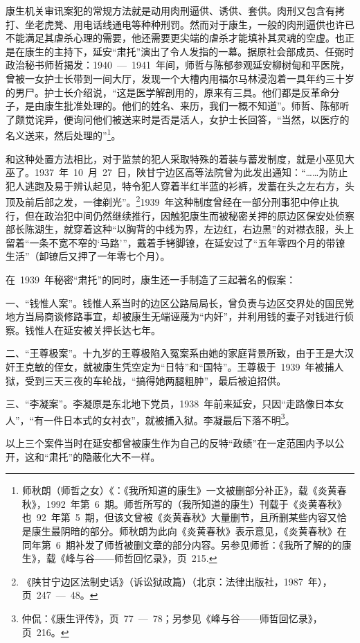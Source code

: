 康生机关审讯案犯的常规方法就是动用肉刑逼供、诱供、套供。肉刑又包含有拷打、坐老虎凳、用电话线通电等种种刑罚。然而对于康生，一般的肉刑逼供也许已不能满足其虐杀心理的需要，他还需要更尖端的虐杀才能填补其灵魂的空虚。也正是在康生的主持下，延安“肃托”演出了令人发指的一幕。据原社会部成员、任弼时政治秘书师哲揭发：1940~—~1941~年间，师哲与陈郁参观延安柳树甸和平医院，曾被一女护士长带到一间大厅，发现一个大槽内用福尔马林浸泡着一具年约三十岁的男尸。护士长介绍说，“这是医学解剖用的，原来有三具。他们都是反革命分子，是由康生批准处理的。他们的姓名、来历，我们一概不知道”。师哲、陈郁听了颇觉诧异，便询问他们被送来时是否是活人，女护士长回答，“当然，以医疗的名义送来，然后处理的”\footnote{师秋朗（师哲之女）《：《我所知道的康生》一文被删部分补正》，载《炎黄春秋》，1992~年第~6~期。师哲所写的（我所知道的康生）刊载于《炎黄春秋》也~92~年第~5~期，但该文曾被《炎黄春秋》大量删节，且所删某些内容又恰是康生最阴暗的部分。师秋朗为此向《炎黄春秋》表示意见，《炎黄春秋》在同年第~6~期补发了师哲被删文章的部分内容。另参见师哲：《我所了解的的康生》，载《峰与谷——师哲回忆录》，页~215.}。

和这种处置方法相比，对于监禁的犯人采取特殊的着装与蓄发制度，就是小巫见大巫了。1937~年~10~月~27~日，陕甘宁边区高等法院曾为此发出通知：“……为防止犯人逃跑及易于辨认起见，特令犯人穿着半红半蓝的衫裤，发蓄在头之左右方，头顶及前后部之发，一律剃光”。\footnote{《陕甘宁边区法制史话》（诉讼狱政篇）（北京：法律出版社，1987~年），页~247~—~48。}1939~年这种制度曾经在一部分刑事犯中停止执行，但在政治犯中间仍然继续推行，因触犯康生而被秘密关押的原边区保安处侦察部长陈湖生，就穿着这种“以胸背的中线为界，左边红，右边黑”的对襟衣服，头上留着“一条不宽不窄的‘马路’”，戴着手铐脚镣，在延安过了“五年零四个月的带镣生活”（卸镣后又押了一年零七个月）。

在~1939~年秘密“肃托”的同时，康生还一手制造了三起著名的假案：

一、“钱惟人案”。钱惟人系当时的边区公路局局长，曾负责与边区交界处的国民党地方当局商谈修路事宜，却被康生无端诬蔑为“内奸”，并利用钱的妻子对钱进行侦察。钱惟人在延安被关押长达七年。

二、“王尊极案”。十九岁的王尊极陷入冤案系由她的家庭背景所致，由于王是大汉奸王克敏的侄女，就被康生凭空定为“日特”和“国特”。王尊极于~1939~年被捕人狱，受到三天三夜的车轮战，“搞得她两腿粗肿”，最后被迫招供。

三、“李凝案”。李凝原是东北地下党员，1938~年前来延安，只因“走路像日本女人”，“有一件日本式的女衬衣”，就被捕入狱。李凝最后下落不明\footnote{仲侃：《康生评传》，页~77~—~78；另参见《峰与谷——师哲回忆录》，页~216。}。

以上三个案件当时在延安都曾被康生作为自己的反特“政绩”在一定范围内予以公开，这和“肃托”的隐蔽化大不一样。

